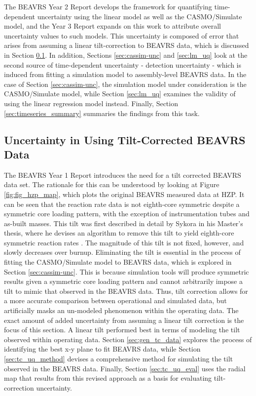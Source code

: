 \documentclass{article}
\begin{document}
The BEAVRS Year 2 Report \cite{liang_year2_report} develops the framework for quantifying time-dependent uncertainty using the linear model as well as the CASMO/Simulate model, and the Year 3 Report \cite{kumar_year3_report} expands on this work to attribute overall uncertainty values to such models. This uncertainty is composed of error that arises from assuming a linear tilt-correction to BEAVRS data, which is discussed in Section \ref{sec:tiltcorr-unc}. In addition, Sections \ref{sec:cassim-unc} and \ref{sec:lm_uq} look at the second source of time-dependent uncertainty - detection uncertainty - which is induced from fitting a simulation model to assembly-level BEAVRS data. In the case of Section \ref{sec:cassim-unc}, the simulation model under consideration is the CASMO/Simulate model, while Section \ref{sec:lm_uq} examines the validity of using the linear regression model instead. Finally, Section \ref{sec:timeseries_summary} summaries the findings from this task.

\subsection{Uncertainty in Using Tilt-Corrected BEAVRS Data}\label{sec:tiltcorr-unc}

The BEAVRS Year 1 Report \cite{liang_year1_report} introduces the need for a tilt corrected BEAVRS data set. The rationale for this can be understood by looking at Figure \ref{fig:fig_hzp_map}, which plots the original BEAVRS measured data at HZP. It can be seen that the reaction rate data is not eighth-core symmetric despite a symmetric core loading pattern, with the exception of instrumentation tubes and as-built masses. This tilt was first described in detail by Sykora in his Master's thesis, where he devises an algorithm to remove this tilt to yield eighth-core symmetric reaction rates \cite{sykora_ms}. The magnitude of this tilt is not fixed, however, and slowly decreases over burnup. Eliminating the tilt is essential in the process of fitting the CASMO/Simulate model to BEAVRS data, which is explored in Section \ref{sec:cassim-unc}. This is because simulation tools will produce symmetric results given a symmetric core loading pattern and cannot arbitrarily impose a tilt to mimic that observed in the BEAVRS data. Thus, tilt correction allows for a more accurate comparison between operational and simulated data, but artificially masks an un-modeled phenomenon within the operating data. The exact amount of added uncertainty from assuming a linear tilt correction is the focus of this section. A linear tilt performed best in terms of modeling the tilt observed within operating data. Section \ref{sec:gen_tc_data} explores the process of identifying the best x-y plane to fit BEAVRS data, while Section \ref{sec:tc_uq_method} devises a comprehensive method for simulating the tilt observed in the BEAVRS data. Finally, Section \ref{sec:tc_uq_eval} uses the radial map that results from this revised approach as a basis for evaluating tilt-correction uncertainty.
\end{document}
